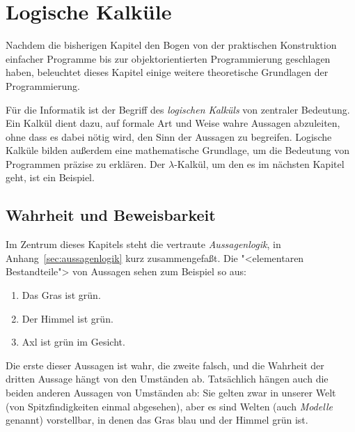 
\chapter{Logische Kalküle}
\label{chap:calc}

Nachdem die bisherigen Kapitel den Bogen von der praktischen Konstruktion
einfacher Programme bis zur
objektorientierten Programmierung geschlagen haben, beleuchtet dieses Kapitel
einige weitere theoretische Grundlagen der
Programmierung.

Für die Informatik ist der Begriff des \emph{logischen Kalküls} von zentraler Bedeutung.
Ein Kalkül dient dazu, auf formale Art und Weise wahre Aussagen abzuleiten, ohne dass
es dabei nötig wird, den Sinn der Aussagen zu begreifen.   
Logische Kalküle bilden außerdem eine mathematische Grundlage, um die
Bedeutung von Programmen präzise zu erklären.  Der $\lambda$-Kalkül,
um den es im nächsten Kapitel geht, ist ein Beispiel.

\section{Wahrheit und Beweisbarkeit}
\label{sec:truth-provability}

Im Zentrum
dieses Kapitels steht die vertraute \textit{Aussagenlogik}, in
Anhang~\ref{sec:aussagenlogik} kurz zusammengefaßt.  Die "<elementaren
Bestandteile"> von Aussagen sehen zum Beispiel so aus:
%
\begin{enumerate}
\item Das Gras ist grün.
\item Der Himmel ist grün.
\item Axl ist grün im Gesicht.
\end{enumerate}
%
Die erste dieser Aussagen ist wahr, die zweite falsch, und die
Wahrheit der dritten Aussage hängt von den Umständen ab.  Tatsächlich
hängen auch die beiden anderen Aussagen von Umständen ab: Sie gelten zwar in
unserer Welt (von Spitzfindigkeiten einmal abgesehen), aber es sind
Welten (auch \textit{Modelle} genannt)
vorstellbar, in denen das Gras blau und der Himmel grün ist.

